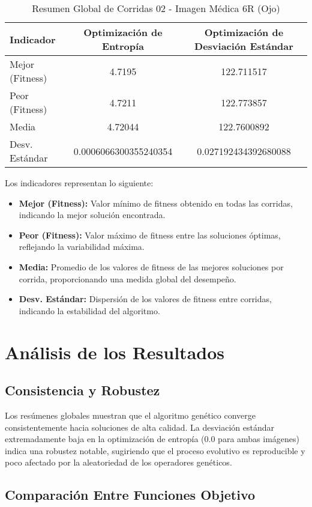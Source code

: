 \begin{table}[H]
\centering
\caption{Resumen Global de Corridas 02 - Imagen Médica 6R (Ojo)}
\begin{tabular}{lcc}
\hline
\textbf{Indicador} & \textbf{Optimización de Entropía} & \textbf{Optimización de Desviación Estándar} \\
\hline
Mejor (Fitness) & 4.7195 & 122.711517 \\
Peor (Fitness) & 4.7211 & 122.773857 \\
Media & 4.72044 & 122.7600892 \\
Desv. Estándar & 0.0006066300355240354 & 0.027192434392680088 \\
\hline
\end{tabular}
\end{table}

Los indicadores representan lo siguiente:
\begin{itemize}
    \item \textbf{Mejor (Fitness):} Valor mínimo de fitness obtenido en todas las corridas, indicando la mejor solución encontrada.
    \item \textbf{Peor (Fitness):} Valor máximo de fitness entre las soluciones óptimas, reflejando la variabilidad máxima.
    \item \textbf{Media:} Promedio de los valores de fitness de las mejores soluciones por corrida, proporcionando una medida global del desempeño.
    \item \textbf{Desv. Estándar:} Dispersión de los valores de fitness entre corridas, indicando la estabilidad del algoritmo.
\end{itemize}

\section{Análisis de los Resultados}

\subsection{Consistencia y Robustez}
Los resúmenes globales muestran que el algoritmo genético converge consistentemente hacia soluciones de alta calidad. La desviación estándar extremadamente baja en la optimización de entropía (0.0 para ambas imágenes) indica una robustez notable, sugiriendo que el proceso evolutivo es reproducible y poco afectado por la aleatoriedad de los operadores genéticos.

\subsection{Comparación Entre Funciones Objetivo}

